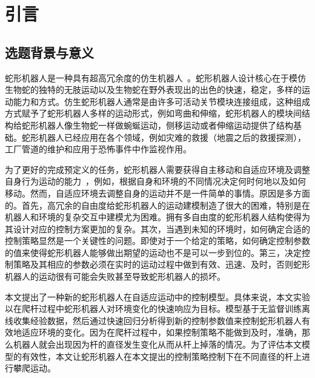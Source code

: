 
\chapter{引言}
\label{cha:introduction}
\section{选题背景与意义}
\label{sec:background}
蛇形机器人是一种具有超高冗余度的仿生机器人~\cite{Chirikjian1995The}。蛇形机器人设计核心在于模仿生物蛇的独特的无肢运动以及生物蛇在野外表现出的出色的快速，稳定，多样的运动能力和方式。仿生蛇形机器人通常是由许多可活动关节模块连接组成，这种组成方式赋予了蛇形机器人多样的运动形式，例如弯曲和伸缩，蛇形机器人的模块间结构给蛇形机器人像生物蛇一样做蜿蜒运动，侧移运动或者伸缩运动提供了结构基础。蛇形机器人已经应用在各个领域，例如灾难的救援（地震之后的救援探测），工厂管道的维护和应用于恐怖事件中作监视作用。

为了更好的完成预定义的任务，蛇形机器人需要获得自主移动和自适应环境及调整自身行为运动的能力~\cite{Liljeb2013Snake}，例如，根据自身和环境的不同情况决定何时何地以及如何移动。然而，自适应环境去调整自身的运动并不是一件简单的事情。原因是多方面的。首先，高冗余的自由度给蛇形机器人的运动建模制造了很大的困难，特别是在机器人和环境的复杂交互中建模尤为困难。拥有多自由度的蛇形机器人结构使得为其设计对应的控制方案更加的复杂。其次，当遇到未知的环境时，如何确定合适的控制策略显然是一个关键性的问题。即使对于一个给定的策略，如何确定控制参数的值来使得蛇形机器人能够做出期望的运动也不是可以一步到位的。第三，决定控制策略及其相应的参数必须在实时的运动过程中做到有效、迅速、及时，否则蛇形机器人的运动很有可能会失败甚至导致蛇形机器人的损坏。

本文提出了一种新的蛇形机器人在自适应运动中的控制模型。具体来说，本文实验以在爬杆过程中蛇形机器人对环境变化的快速响应为目标。模型基于无监督训练离线收集经验数据，然后通过快速回归分析得到新的控制参数值来控制蛇形机器人有效地适应环境的变化。因为在爬杆过程中，如果控制策略不能做到及时，准确，那么机器人就会出现因为杆的直径发生变化从而从杆上掉落的情况。为了评估本文模型的有效性，本文让蛇形机器人在本文提出的控制策略控制下在不同直径的杆上进行攀爬运动。

